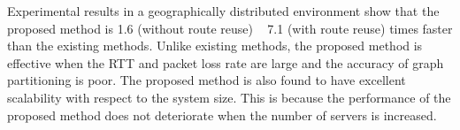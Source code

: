 Experimental results in a geographically distributed environment show that the proposed method is 1.6 (without route reuse) ~ 7.1 (with route reuse) times faster than the existing methods. Unlike existing methods, the proposed method is effective when the RTT and packet loss rate are large and the accuracy of graph partitioning is poor. The proposed method is also found to have excellent scalability with respect to the system size. This is because the performance of the proposed method does not deteriorate when the number of servers is increased.

\vspace{36pt}
\thispagestyle{empty}
\clearpage